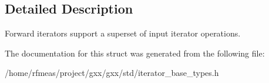 \subsection{Detailed Description}
Forward iterators support a superset of input iterator operations. 

The documentation for this struct was generated from the following file\+:\begin{DoxyCompactItemize}
\item 
/home/rfmeas/project/gxx/gxx/std/iterator\+\_\+base\+\_\+types.\+h\end{DoxyCompactItemize}
